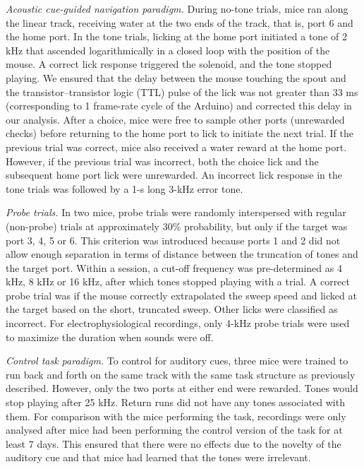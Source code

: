 \textit{Acoustic cue-guided navigation paradigm.} During no-tone trials, mice ran along the linear track, receiving water at the two ends of the track, that is, port 6 and the home port. In the tone trials, licking at the home port initiated a tone of 2 kHz that ascended logarithmically in a closed loop with the position of the mouse. A correct lick response triggered the solenoid, and the tone stopped playing. We ensured that the delay between the mouse touching the spout and the transistor--transistor logic (TTL) pulse of the lick was not greater than 33 ms (corresponding to 1 frame-rate cycle of the Arduino) and corrected this delay in our analysis. After a choice, mice were free to sample other ports (unrewarded checks) before returning to the home port to lick to initiate the next trial. If the previous trial was correct, mice also received a water reward at the home port. However, if the previous trial was incorrect, both the choice lick and the subsequent home port lick were unrewarded. An incorrect lick response in the tone trials was followed by a 1-s long 3-kHz error tone.

\textit{Probe trials.} In two mice, probe trials were randomly interspersed with regular (non-probe) trials at approximately 30\% probability, but only if the target was port 3, 4, 5 or 6. This criterion was introduced because ports 1 and 2 did not allow enough separation in terms of distance between the truncation of tones and the target port. Within a session, a cut-off frequency was pre-determined as 4 kHz, 8 kHz or 16 kHz, after which tones stopped playing with a trial. A correct probe trial was if the mouse correctly extrapolated the sweep speed and licked at the target based on the short, truncated sweep. Other licks were classified as incorrect. For electrophysiological recordings, only 4-kHz probe trials were used to maximize the duration when sounds were off.

\textit{Control task paradigm.} To control for auditory cues, three mice were trained to run back and forth on the same track with the same task structure as previously described. However, only the two ports at either end were rewarded. Tones would stop playing after 25 kHz. Return runs did not have any tones associated with them. For comparison with the mice performing the task, recordings were only analysed after mice had been performing the control version of the task for at least 7 days. This ensured that there were no effects due to the novelty of the auditory cue and that mice had learned that the tones were irrelevant.


